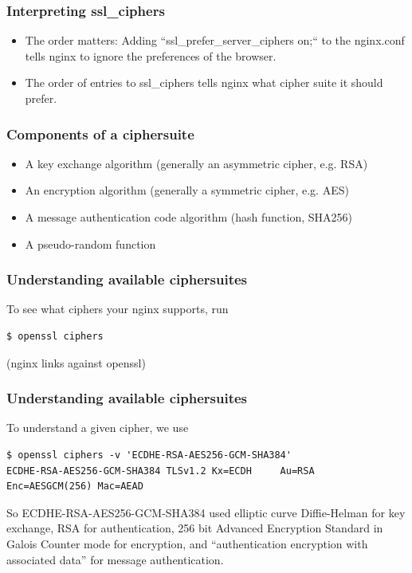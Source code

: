 \documentclass[9pt]{beamer}
\begin{document}
\begin{frame}
\frametitle{Interpreting ssl\_ciphers}

\begin{itemize}
\item The order matters: Adding ``ssl\_prefer\_server\_ciphers on;`` to the nginx.conf tells nginx to ignore the preferences of the browser.

\item The order of entries to ssl\_ciphers tells nginx what cipher suite it should prefer.
\end{itemize}
\end{frame}

\begin{frame}[fragile]
\frametitle{Components of a ciphersuite}
\begin{itemize}
\item A key exchange algorithm (generally an asymmetric cipher, e.g. RSA)
\item An encryption algorithm (generally a symmetric cipher, e.g. AES)
\item A message authentication code algorithm  (hash function, SHA256)
\item A pseudo-random function
\end{itemize}
\end{frame}

\begin{frame}[fragile]
\frametitle{Understanding available ciphersuites}
To see what ciphers your nginx supports, run
\begin{verbatim}
$ openssl ciphers
\end{verbatim}
(nginx links against openssl)
\end{frame}

\begin{frame}[fragile]
\frametitle{Understanding available ciphersuites}
To understand a given cipher, we use
\begin{verbatim}
$ openssl ciphers -v 'ECDHE-RSA-AES256-GCM-SHA384'
ECDHE-RSA-AES256-GCM-SHA384 TLSv1.2 Kx=ECDH     Au=RSA  Enc=AESGCM(256) Mac=AEAD
\end{verbatim}
So ECDHE-RSA-AES256-GCM-SHA384 used elliptic curve Diffie-Helman for key exchange, RSA for authentication, 256 bit Advanced Encryption Standard in Galois Counter mode for encryption, and ``authentication encryption with associated data'' for message authentication.
\end{frame}
\end{document}
